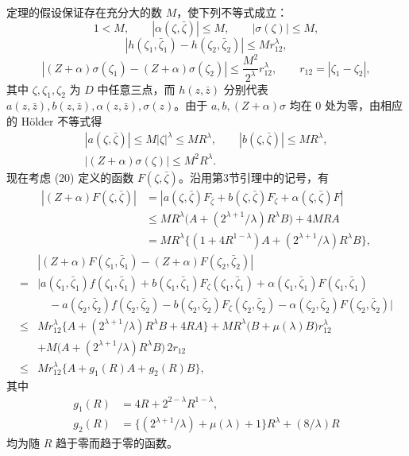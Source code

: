 \documentclass[UTF8,a4paper,11pt,fontset=fandol]{ctexart}
\newcommand{\zz}{\bar\zeta}
\begin{document}
定理的假设保证存在充分大的数 $M$，使下列不等式成立：
\begin{equation}1<M,\qquad|\alpha(\zeta,\zz)|\le M,\qquad|\sigma(\zeta)|\le M,\tag{31}\end{equation}
\begin{equation}|h(\zeta_1,\bar\zeta_1)-h(\zeta_2,\bar\zeta_2)|\le Mr_{12}^{\lambda},\tag{32}\end{equation}
\begin{equation}|(Z+\alpha)\sigma(\zeta_1)-(Z+\alpha)\sigma(\zeta_2)|\le\frac{M^2}{2^\lambda}r_{12}^{\lambda},\qquad r_{12}=|\zeta_1-\zeta_2|,\tag{33}\end{equation}
其中 $\zeta,\zeta_1,\zeta_2$ 为 $D$ 中任意三点，而 $h(z,\bar z)$ 分别代表 $a(z,\bar z),b(z,\bar z),\alpha(z,\bar z),\sigma(z)$。由于 $a,b,(Z+\alpha)\sigma$ 均在 $0$ 处为零，由相应的 Hölder 不等式得
\begin{equation}\begin{gathered}|a(\zeta,\zz)|\le M|\zeta|^\lambda\le MR^\lambda,\qquad|b(\zeta,\zz)|\le MR^\lambda,\\
|(Z+\alpha)\sigma(\zeta)|\le M^2R^\lambda.
\end{gathered}\tag{34}\end{equation}
现在考虑 (20) 定义的函数 $F(\zeta,\zz)$。沿用第3节引理中的记号，有
\begin{equation}\begin{aligned}
|(Z+\alpha)F(\zeta,\zz)|
&=|a(\zeta,\zz)F_{\bar\zeta}+b(\zeta,\zz)F_\zeta+\alpha(\zeta,\zz)F|\\
&\le MR^\lambda\bigl(A+(2^{\lambda+1}/\lambda)R^\lambda B\bigr)+4MRA\\
&=MR^\lambda\bigl\{(1+4R^{1-\lambda})A+(2^{\lambda+1}/\lambda)R^\lambda B\bigr\},
\end{aligned}\tag{35}\end{equation}
\begin{equation}\begin{aligned}
&|(Z+\alpha)F(\zeta_1,\bar\zeta_1)-(Z+\alpha)F(\zeta_2,\bar\zeta_2)|\\
={}&|a(\zeta_1,\bar\zeta_1)f(\zeta_1,\bar\zeta_1)+b(\zeta_1,\bar\zeta_1)F_\zeta(\zeta_1,\bar\zeta_1)
+\alpha(\zeta_1,\bar\zeta_1)F(\zeta_1,\bar\zeta_1)\\
&\quad-a(\zeta_2,\bar\zeta_2)f(\zeta_2,\bar\zeta_2)-b(\zeta_2,\bar\zeta_2)F_\zeta(\zeta_2,\bar\zeta_2)
-\alpha(\zeta_2,\bar\zeta_2)F(\zeta_2,\bar\zeta_2)|\\
\le{}&Mr_{12}^\lambda\{A+(2^{\lambda+1}/\lambda)R^\lambda B+4RA\}
+MR^\lambda\bigl(B+\mu(\lambda)B\bigr)r_{12}^\lambda\\
&+M\bigl(A+(2^{\lambda+1}/\lambda)R^\lambda B\bigr)\,2r_{12}\\
\le{}&Mr_{12}^\lambda\{A+g_1(R)A+g_2(R)B\},
\end{aligned}\tag{36}\end{equation}
其中
\begin{equation}\begin{aligned}g_1(R)&=4R+2^{2-\lambda}R^{1-\lambda},\\
g_2(R)&=\{(2^{\lambda+1}/\lambda)+\mu(\lambda)+1\}R^\lambda+(8/\lambda)R
\end{aligned}\tag{37}\end{equation}
均为随 $R$ 趋于零而趋于零的函数。
\end{document}
